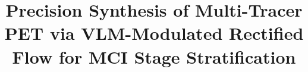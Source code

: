 \title{Precision Synthesis of Multi-Tracer PET via VLM-Modulated Rectified Flow for MCI Stage Stratification}
